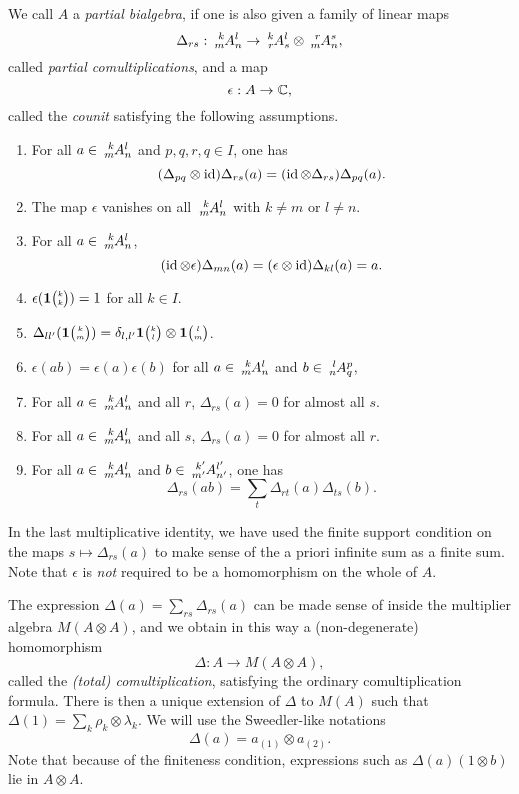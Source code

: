 We call $A$ a \emph{partial bialgebra}, \cite[Definition 1.5]{DCT1} if one is also given a family of linear maps \[\Delta_{rs}: \Gr{A}{k}{l}{m}{n}\rightarrow \Gr{A}{k}{l}{r}{s} \otimes \Gr{A}{r}{s}{m}{n},\] called \emph{partial comultiplications}, and a map \[\epsilon: A \rightarrow \mathbb{C},\] called the \emph{counit} satisfying the following assumptions.
\begin{enumerate}\renewcommand{\labelenumi}{(PB\arabic{enumi})}
\item For all $a\in \Gr{A}{k}{l}{m}{n}$ and $p,q,r,q\in I$, one has \[(\Delta_{pq}\otimes \operatorname{id})\Delta_{rs}(a) = (\operatorname{id}\otimes \Delta_{rs})\Delta_{pq}(a).\]
\item The map $\epsilon$ vanishes on all $\Gr{A}{k}{l}{m}{n}$ with $k\neq m$ or $l\neq n$. 
\item For all $a\in \Gr{A}{k}{l}{m}{n}$, \[(\operatorname{id}\otimes \epsilon)\Delta_{mn}(a) = (\epsilon\otimes \operatorname{id})\Delta_{kl}(a) = a.\]
\item $\epsilon(\mathbf{1}{\tiny {\begin{pmatrix} k\\k\end{pmatrix}}})= 1$ for all $k\in I$. 
\item $\Delta_{ll'}(\mathbf{1}{\tiny {\begin{pmatrix} k\\m\end{pmatrix}}}) = \delta_{l,l'} \mathbf{1}{\tiny {\begin{pmatrix} k\\l\end{pmatrix}}}\otimes \mathbf{1}{\tiny {\begin{pmatrix} l\\m\end{pmatrix}}}$.
\item $\epsilon(ab) = \epsilon(a)\epsilon(b)$ for all $a\in \Gr{A}{k}{l}{m}{n}$ and $b\in \Gr{A}{l}{p}{n}{q}$,
\item For all $a\in \Gr{A}{k}{l}{m}{n}$ and all $r$, $\Delta_{rs}(a)=0$ for almost all $s$.
\item For all $a\in \Gr{A}{k}{l}{m}{n}$ and all $s$, $\Delta_{rs}(a)=0$ for almost all $r$.
\item For all $a\in \Gr{A}{k}{l}{m}{n}$ and $b\in \Gr{A}{k'}{l'}{m'}{n'}$, one has \[\Delta_{rs}(ab) = \sum_{t} \Delta_{rt}(a)\Delta_{ts}(b).\]
\end{enumerate} 

In the last multiplicative identity, we have used the finite support condition on the maps $s\mapsto \Delta_{rs}(a)$ to make sense of the a priori infinite sum as a finite sum. Note that $\epsilon$ is \emph{not} required to be a homomorphism on the whole of $A$.

The expression $\Delta(a) = \sum_{rs}\Delta_{rs}(a)$ can be made sense of inside the multiplier algebra $M(A\otimes A)$, and we obtain in this way a (non-degenerate) homomorphism \[\Delta: A\rightarrow M(A\otimes A),\] called the \emph{(total) comultiplication}, satisfying the ordinary comultiplication formula. There is then a unique extension of $\Delta$ to $M(A)$ such that $\Delta(1) =\sum_k \rho_k\otimes \lambda_k$. We will use the Sweedler-like notations \[\Delta(a) = a_{(1)}\otimes a_{(2)}.\] Note that because of the finiteness condition, expressions such as $\Delta(a)(1\otimes b)$ lie in $A\otimes A$.

